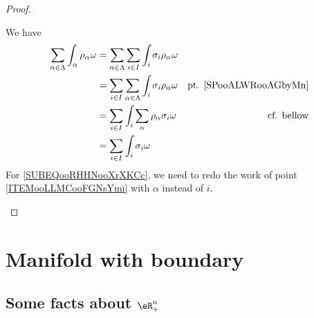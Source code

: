 \begin{proof}
\begin{subproof}
		\begin{subproof}

					\label{SPooALWRooAGbyMn}


			\spitem[Conclusion]
			We have
			\begin{subequations}
				\begin{align}
					\sum_{\alpha\in \Lambda}\int_{\alpha}\rho_{\alpha}\omega & =\sum_{\alpha\in\Lambda}\sum_{i\in I}\int_i\sigma_i\rho_{\alpha}\omega                                                \\
					                                                         & =\sum_{i\in I}\sum_{\alpha\in\Lambda}\int_i\sigma_i\rho_{\alpha}\omega & \text{pt. \ref{SPooALWRooAGbyMn}}            \\
					                                                         & =\sum_{i\in I}\int_{i}\sum_{\alpha}\rho_{\alpha}\sigma_i\omega         & \text{cf. bellow}		\label{SUBEQooRHHNooXrXKCc} \\
					                                                         & = \sum_{i\in I}\int_i\sigma_i\omega
				\end{align}
			\end{subequations}
			For \eqref{SUBEQooRHHNooXrXKCc}, we need to redo the work of point \ref{ITEMooLLMCooFGNsYmi} with \( \alpha\) instead of \( i\).
		\end{subproof}
	\end{subproof}
\end{proof}



\section{Manifold with boundary}

\subsection{Some facts about \( \eR^n_+\)}

